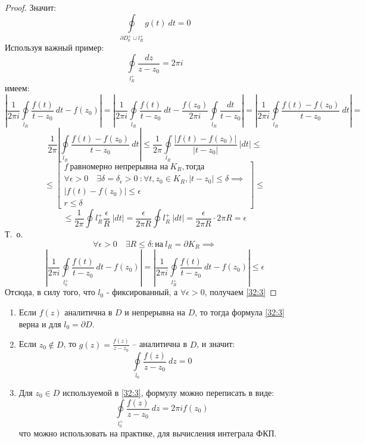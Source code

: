 \documentclass[../../main.tex]{subfiles}
\begin{document}
\begin{proof}
	Значит:
	\[ \oint \limits_{\partial D_0^{+} \cup l_{R}^{+} }  g(t) \ dt = 0   \]
	Используя важный пример:
	\[  \oint \limits_{ l_{R}^{+} }  \frac{dz}{z-z_0} = 2 \pi i    \]
	имеем:
	\[     \left| \frac{1}{2 \pi i} \oint \limits_{l_R} \frac{f(t)}{t-z_0} \ dt - f(z_0)   \right| =  \left| \frac{1}{2 \pi i} \oint \limits_{l_R} \frac{f(t)}{t-z_0} \ dt - \frac{f(z_0)}{2 \pi i} \oint \limits_{l_R} \frac{dt}{t-z_0}   \right| = \left| \frac{1}{2 \pi i} \oint \limits_{l_R} \frac{f(t) - f(z_0)}{t-z_0} \ dt  \right| = \]
	\[  \frac{1}{2 \pi }  \left| \oint \limits_{l_R} \frac{f(t) - f(z_0)}{t-z_0} \ dt \right| \le  \frac{1}{2 \pi } \oint \limits_{l_R} \frac{ \left|  f(t) - f(z_0) \right| }{ \left|  t-z_0   \right|   } \ \left| dt   \right| \le    \]
	\[  \le \left[ \begin{gathered}  
	f \ \text{равномерно непрерывна на} \ K_R, \text{тогда} \\
	\forall \epsilon >0 \quad \exists \delta = \delta_{\epsilon} > 0 \ : \forall t,z_0 \in K_R, |t-z_0| \le \delta  \implies\\
	|f(t) - f(z_0)| \le \epsilon \\
	r \le \delta
	\end{gathered}\right] \le   \]
	\[ \le \frac{1}{2\pi} \oint \limits{l_R^{+}} \frac{\epsilon}{R} \ |dt| = \frac{\epsilon}{2 \pi R } \oint \limits{l_R^{+}} \ |dt| = \frac{\epsilon}{2 \pi R } \cdot 2 \pi R = \epsilon     \]
	Т.~о. 
	\[  \forall \epsilon > 0 \quad \exists R \le \delta : \text{на} \ l_R = \partial K_R \implies        \]
	\[ \left| \frac{1}{2 \pi i} \oint \limits_{l_0^+} \frac{f(t)}{t-z_0} \ dt - f(z_0) \right| = \left| \frac{1}{2 \pi i} \oint \limits_{l_R^+} \frac{f(t)}{t-z_0} \ dt - f(z_0) \right| \le \epsilon    \]
	Отсюда, в силу того,  что $l_0$ -  фиксированный, а $\forall \epsilon > 0$, получаем \eqref{32:3}
\end{proof}	
\begin{remarks}
	\begin{enumerate}
		\item Если $f(z)$ аналитична в $D$ и непрерывна на $D$, то тогда формула \eqref{32:3} верна и для $l_0 = \partial D$.
		\item Если $z_0 \notin D$, то $g(z) = \frac{f(z)}{z-z_0}$ \--- аналитична в $D$, и значит:
		\[  \oint \limits_{l_0} \frac{f(z)}{z-z_0} \ dz = 0  \]
		\item Для $z_0 \in D$ используемой в \eqref{32:3}, формулу можно переписать в виде:
		\begin{equation}
		\label{32:5}
		\oint \limits_{l_0^+} \frac{f(z)}{z-z_0} \ dz = 2 \pi i f(z_0)
		\end{equation}
		что можно использовать на практике, для вычисления интеграла ФКП.
	\end{enumerate}
\end{remarks}	
\end{document}
